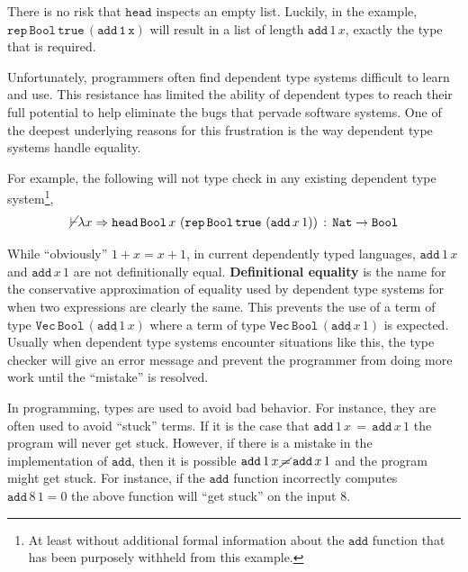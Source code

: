 There is no risk that $\mathtt{head}$ inspects an empty list.
Luckily, in the example, $\mathtt{\mathtt{rep}\,\mathtt{Bool}\,\mathtt{true}\,\left(\mathtt{add}\,1\,x\right)}$ will result in a list of length $\mathtt{add}\,1\,x$, exactly the type that is required.


Unfortunately, programmers often find dependent type systems difficult to learn and use.
This resistance has limited the ability of dependent types to reach their full potential to help eliminate the bugs that pervade software systems.
One of the deepest underlying reasons for this frustration is the way dependent type systems handle equality.

For example, the following will not type check in any existing dependent type system\footnote{ %
  At least without additional formal information about the $\mathtt{add}$ function that has been purposely withheld from this example.
  },
\[
\cancel{\vdash}\lambda x\Rightarrow\mathtt{head}\,\mathtt{Bool}\,x\,\left(\mathtt{rep}\,\mathtt{Bool}\,\mathtt{true}\,\left(\mathtt{add}\,x\,1\right)\right)\,:\,\mathtt{Nat}{} \rightarrow\mathtt{Bool}
\]

While ``obviously'' $1+x=x+1$, in current dependently typed languages, $\mathtt{add}\,1\,x$ and $\mathtt{add}\,x\,1$ are not definitionally equal.
\textbf{Definitional equality} is the name for the conservative approximation of equality used by dependent type systems for when two expressions are clearly the same.
This prevents the use of a term of type
  $\mathtt{Vec}\,\mathtt{Bool}\,\left(\underline{\mathtt{add}\,1\,x}\right)$
  where a term of type
  $\mathtt{Vec}\,\mathtt{Bool}\,\left(\underline{\mathtt{add}\,x\,1}\right)$
  is expected.
Usually when dependent type systems encounter situations like this, the type checker will give an error message and prevent the programmer from doing more work until the ``mistake'' is resolved.

In programming, types are used to avoid bad behavior.
For instance, they are often used to avoid ``stuck'' terms.
If it is the case that $\mathtt{add}\,1\,x\,=\,\mathtt{add}\,x\,1$ the program will never get stuck.
However, if there is a mistake in the implementation of $\mathtt{add}$, then it is possible $\mathtt{add}\,1\,x\,\cancel{=}\,\mathtt{add}\,x\,1$ and the program might get stuck.
For instance, if the $\mathtt{add}$ function incorrectly computes $\mathtt{add}\,8\,1=0$ the above function will ``get stuck'' on the input $8$.

